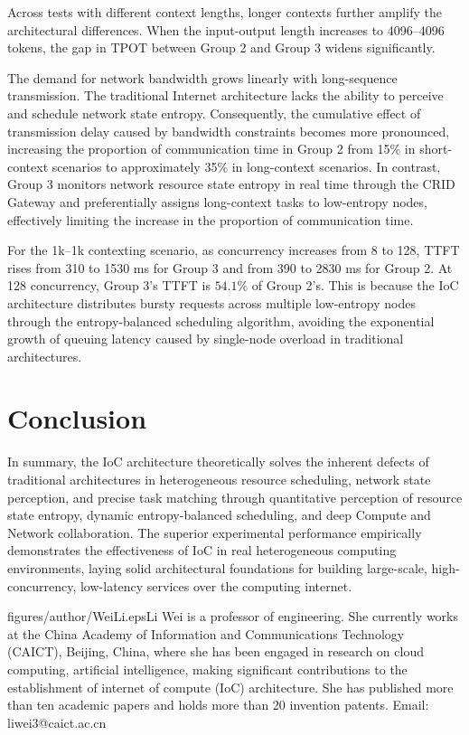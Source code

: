 \documentclass{ccjnl}
\begin{document}
Across tests with different context lengths, longer contexts further amplify the architectural differences. When the input-output length increases to 4096--4096 tokens, the gap in TPOT between Group 2 and Group 3 widens significantly.

The demand for network bandwidth grows linearly with long-sequence transmission. The traditional Internet architecture lacks the ability to perceive and schedule network state entropy. Consequently, the cumulative effect of transmission delay caused by bandwidth constraints becomes more pronounced, increasing the proportion of communication time in Group 2 from 15\% in short-context scenarios to approximately 35\% in long-context scenarios. In contrast, Group 3 monitors network resource state entropy in real time through the CRID Gateway and preferentially assigns long-context tasks to low-entropy nodes, effectively limiting the increase in the proportion of communication time.

For the 1k–1k contexting scenario, as concurrency increases from 8 to 128, TTFT rises from 310 to 1530 ms for Group 3 and from 390 to 2830 ms for Group 2. At 128 concurrency, Group 3’s TTFT is $54.1\%$ of Group 2’s. This is because the IoC architecture distributes bursty requests across multiple low-entropy nodes through the entropy-balanced scheduling algorithm, avoiding the exponential growth of queuing latency caused by single-node overload in traditional architectures.

\section{Conclusion}
\label{s7}
In summary, the IoC architecture theoretically solves the inherent defects of traditional architectures in heterogeneous resource scheduling, network state perception, and precise task matching through quantitative perception of resource state entropy, dynamic entropy-balanced scheduling, and deep Compute and Network collaboration. The superior experimental performance empirically demonstrates the effectiveness of IoC in real heterogeneous computing environments, laying solid architectural foundations for building large-scale, high-concurrency, low-latency services over the computing internet.

\flushbottom


\biographies

\begin{CCJNLbiography}{figures/author/WeiLi.eps}{Li Wei}
	is a professor of engineering. She currently works at the China Academy of Information and Communications Technology (CAICT), Beijing, China, where she has been engaged in research on cloud computing, artificial intelligence, making significant contributions to the establishment of internet of compute (IoC) architecture. She has published more than ten academic papers and holds more than 20 invention patents. Email: liwei3@caict.ac.cn
\end{CCJNLbiography}
\end{document}
